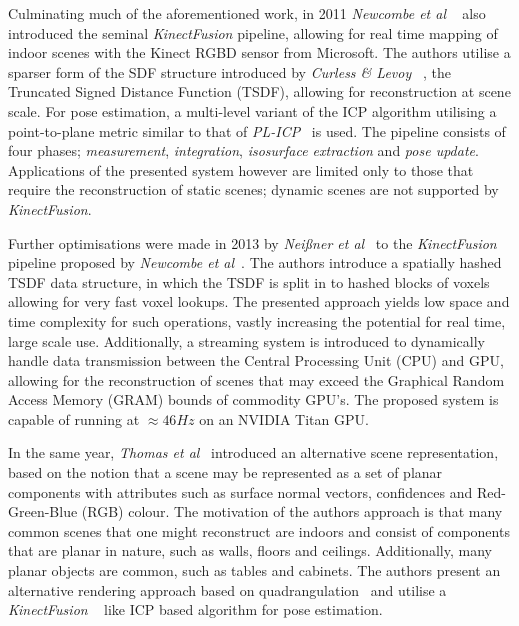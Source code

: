 Culminating much of the aforementioned work, in 2011 \textit{Newcombe et al} 
~\cite{Newcombe2011} also introduced the seminal \textit{KinectFusion} pipeline, allowing 
for real time mapping of indoor scenes with the Kinect RGBD sensor from Microsoft. The 
authors utilise a sparser form of the SDF structure introduced by \textit{Curless \& Levoy} 
~\cite{Curless1996}, the Truncated Signed Distance Function (TSDF), allowing for reconstruction 
at scene scale. For pose estimation, a multi-level variant of the ICP algorithm utilising a 
point-to-plane metric similar to that of \textit{PL-ICP}~\cite{Censi2008} is used. The pipeline 
consists of four phases; \textit{measurement}, \textit{integration}, \textit{isosurface extraction} 
and \textit{pose update}. Applications of the presented system however are limited only to 
those that require the reconstruction of static scenes; dynamic scenes are not supported 
by \textit{KinectFusion}.

Further optimisations were made in 2013 by \textit{Nei{\ss}ner et al}~\cite{NieBner2013} to the 
\textit{KinectFusion} pipeline proposed by \textit{Newcombe et al}~\cite{Newcombe2011}. The authors 
introduce a spatially hashed TSDF data structure, in which the TSDF is split in to hashed blocks of 
voxels allowing for very fast voxel lookups. The presented approach yields low space and time complexity 
for such operations, vastly increasing the potential for real time, large scale use. Additionally, 
a streaming system is introduced to dynamically handle data transmission between the Central Processing Unit 
(CPU) and GPU, allowing for the reconstruction of scenes that may exceed the Graphical Random Access Memory (GRAM) 
bounds of commodity GPU's. The proposed system is capable of running at \(\approx46Hz\) on an NVIDIA Titan GPU.\@

In the same year, \textit{Thomas et al}~\cite{Thomas2013} introduced an alternative scene 
representation, based on the notion that a scene may be represented as a set of planar 
components with attributes such as surface normal vectors, confidences and Red-Green-Blue (RGB) colour. 
The motivation of the authors approach is that many common scenes that one might reconstruct are indoors and 
consist of components that are planar in nature, such as walls, floors and ceilings. Additionally, 
many planar objects are common, such as tables and cabinets. The authors present an alternative 
rendering approach based on quadrangulation~\cite{Dong2006} and utilise a \textit{KinectFusion} 
~\cite{Newcombe2011} like ICP based algorithm for pose estimation.

